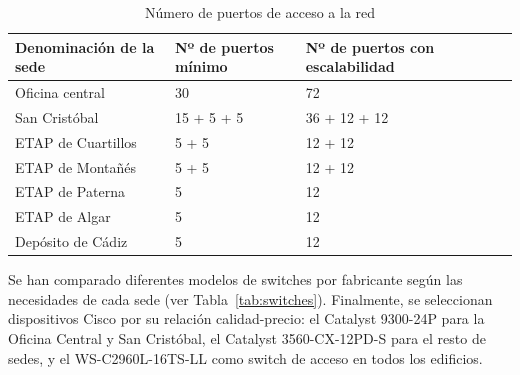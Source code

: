 \begin{table}[H]
	\centering
	\small
	\begin{tabular}{|l|l|l|l|l|}
		\hline
		\textbf{Denominación de la sede} & \textbf{Nº de puertos mínimo} & \textbf{Nº de puertos con escalabilidad} \\ \hline
		Oficina central                  & 30                            & 72                                       \\ \hline
		San Cristóbal                    & 15 + 5 + 5                    & 36 + 12 + 12                             \\ \hline
		ETAP de Cuartillos               & 5 + 5                         & 12 + 12                                  \\ \hline
		ETAP de Montañés                 & 5 + 5                         & 12 + 12                                  \\ \hline
		ETAP de Paterna                  & 5                             & 12                                       \\ \hline
		ETAP de Algar                    & 5                             & 12                                       \\ \hline
		Depósito de Cádiz                & 5                             & 12                                       \\ \hline
	\end{tabular}
	\caption{Número de puertos de acceso a la red}
	\label{tab:sedes_puertos_acceso}
\end{table}

Se han comparado diferentes modelos de switches por fabricante según las necesidades de cada sede (ver Tabla~\ref{tab:switches}). Finalmente, se seleccionan dispositivos Cisco por su relación calidad-precio: el Catalyst 9300-24P \cite{cisco_9300_24p_e_shop, cisco_9300_24p_e_datasheet} para la Oficina Central y San Cristóbal, el Catalyst 3560-CX-12PD-S \cite{cisco_3560_cx_12pd_s_shop, cisco_3560_cx_12pd_s_datasheet} para el resto de sedes, y el WS-C2960L-16TS-LL \cite{cisco_2960l_16ts_ll_datasheet} como switch de acceso en todos los edificios.

